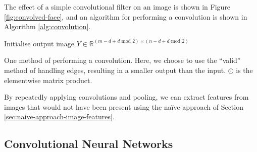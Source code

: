         The effect of a simple convolutional filter on an image is shown in
        Figure \ref{fig:convolved-face}, and an algorithm for performing a
        convolution is shown in Algorithm \ref{alg:convolution}.

        \begin{algorithm}

            Initialise output image $Y \in \mathbb{R}^{(m - d + d \text{ mod } 2) \times (n - d + d \text{ mod } 2)}$\;

            \caption{One method of performing a convolution. Here, we choose to
                use the ``valid'' method of handling edges, resulting in a
                smaller output than the input. $\odot$ is the elementwise
                matrix product.}
            \label{alg:convolution}
        \end{algorithm}

        By repeatedly applying convolutions and pooling, we can extract features
        from images that would not have been present using the na\"ive approach
        of Section \ref{sec:naive-approach-image-features}.


    \subsection{Convolutional Neural Networks}
    \label{sec:convolutional-neural-networks}

